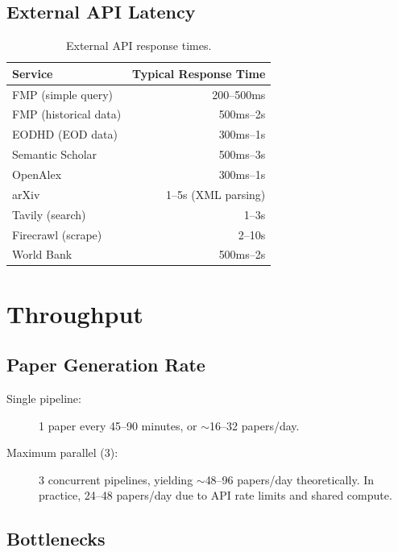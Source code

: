 \subsection{External API Latency}

\begin{table}[H]
\centering
\caption{External API response times.}
\label{tab:api-latency}
\begin{tabular}{lr}
\toprule
\textbf{Service} & \textbf{Typical Response Time} \\
\midrule
FMP (simple query) & 200--500ms \\
FMP (historical data) & 500ms--2s \\
EODHD (EOD data) & 300ms--1s \\
Semantic Scholar & 500ms--3s \\
OpenAlex & 300ms--1s \\
arXiv & 1--5s (XML parsing) \\
Tavily (search) & 1--3s \\
Firecrawl (scrape) & 2--10s \\
World Bank & 500ms--2s \\
\bottomrule
\end{tabular}
\end{table}

\section{Throughput}
\label{sec:perf:throughput}

\subsection{Paper Generation Rate}

\begin{description}
  \item[Single pipeline:] 1 paper every 45--90 minutes, or $\sim$16--32 papers/day.
  \item[Maximum parallel (3):] 3 concurrent pipelines, yielding $\sim$48--96 papers/day theoretically. In practice, 24--48 papers/day due to API rate limits and shared compute.
\end{description}

\subsection{Bottlenecks}

